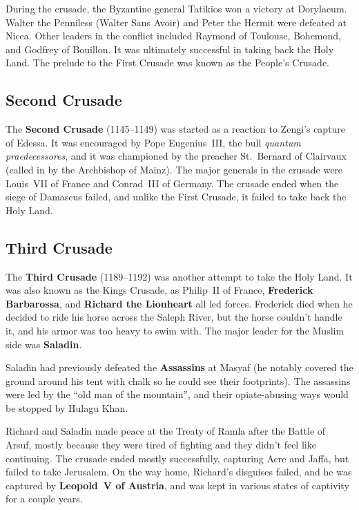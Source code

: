 During the crusade, the Byzantine general Tatikios won a victory at Dorylaeum.
Walter the Penniless (Walter Sans Avoir) and Peter the Hermit were defeated at Nicea.
Other leaders in the conflict included Raymond of Toulouse, Bohemond, and Godfrey of Bouillon.
It was ultimately successful in taking back the Holy Land.
The prelude to the First Crusade was known as the People's Crusade.

\subsection*{Second Crusade}

The \textbf{Second Crusade} (1145--1149) was started as a reaction to Zengi's capture of Edessa.
It was encouraged by Pope Eugenius~III\@, the bull \textit{quantum praedecessores},
and it was championed by the preacher St.\ Bernard of Clairvaux (called in by the Archbishop of Mainz).
The major generals in the crusade were Louis~VII of France and Conrad~III of Germany.
The crusade ended when the siege of Damascus failed, and unlike the First Crusade,
it failed to take back the Holy Land.

\subsection*{Third Crusade}

The \textbf{Third Crusade} (1189--1192) was another attempt to take the Holy Land.
It was also known as the Kings Crusade,
as Philip~II of France, \textbf{Frederick Barbarossa}, and \textbf{Richard the Lionheart} all led forces.
Frederick died when he decided to ride his horse across the Saleph River,
but the horse couldn't handle it, and his armor was too heavy to swim with.
The major leader for the Muslim side was \textbf{Saladin}.

Saladin had previously defeated the \textbf{Assassins} at Masyaf
(he notably covered the ground around his tent with chalk so he could see their footprints).
The assassins were led by the ``old man of the mountain'',
and their opiate-abusing ways would be stopped by Hulagu Khan.

Richard and Saladin made peace at the Treaty of Ramla after the Battle of Arsuf,
mostly because they were tired of fighting and they didn't feel like continuing.
The crusade ended mostly successfully, capturing Acre and Jaffa, but failed to take Jerusalem.
On the way home, Richard's disguises failed, and he was captured by \textbf{Leopold~V of Austria},
and was kept in various states of captivity for a couple years.

